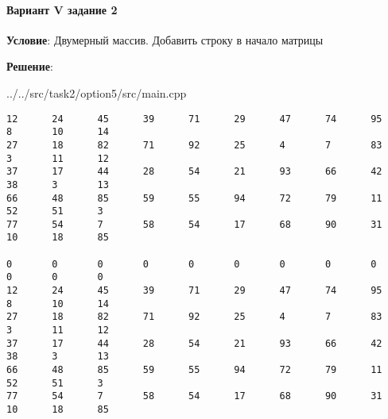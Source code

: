 \paragraph{Вариант V задание 2} \hspace{0pt}

\textbf{Условие}:
Двумерный массив.
Добавить строку в начало матрицы

\textbf{Решение}:


{../../src/task2/option5/src/main.cpp}

\begin{lstlisting}[language=Out,]
12      24      45      39      71      29      47      74      95      8       10      14
27      18      82      71      92      25      4       7       83      3       11      12
37      17      44      28      54      21      93      66      42      38      3       13
66      48      85      59      55      94      72      79      11      52      51      3
77      54      7       58      54      17      68      90      31      10      18      85

0       0       0       0       0       0       0       0       0       0       0       0
12      24      45      39      71      29      47      74      95      8       10      14
27      18      82      71      92      25      4       7       83      3       11      12
37      17      44      28      54      21      93      66      42      38      3       13
66      48      85      59      55      94      72      79      11      52      51      3
77      54      7       58      54      17      68      90      31      10      18      85
\end{lstlisting}
